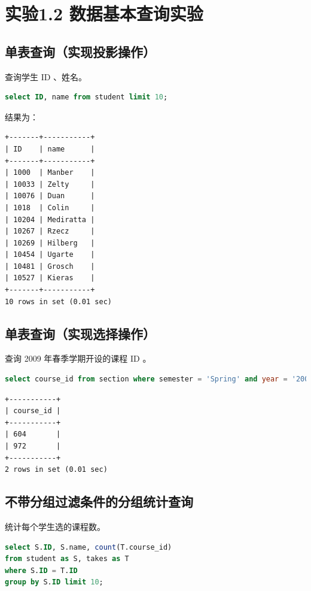 \documentclass{article}
\begin{document}
\section{实验1.2 数据基本查询实验}

\subsection{单表查询（实现投影操作）}

查询学生 ID 、姓名。

\begin{lstlisting}[language=sql]
select ID, name from student limit 10;
\end{lstlisting}

结果为：

\begin{lstlisting}
+-------+-----------+
| ID    | name      |
+-------+-----------+
| 1000  | Manber    |
| 10033 | Zelty     |
| 10076 | Duan      |
| 1018  | Colin     |
| 10204 | Mediratta |
| 10267 | Rzecz     |
| 10269 | Hilberg   |
| 10454 | Ugarte    |
| 10481 | Grosch    |
| 10527 | Kieras    |
+-------+-----------+
10 rows in set (0.01 sec)
\end{lstlisting}

\subsection{单表查询（实现选择操作）}

查询 2009 年春季学期开设的课程 ID 。

\begin{lstlisting}[language=sql]
select course_id from section where semester = 'Spring' and year = '2009';
\end{lstlisting}

\begin{lstlisting}
+-----------+
| course_id |
+-----------+
| 604       |
| 972       |
+-----------+
2 rows in set (0.01 sec)
\end{lstlisting}

\subsection{不带分组过滤条件的分组统计查询}

统计每个学生选的课程数。

\begin{lstlisting}[language=sql]
select S.ID, S.name, count(T.course_id) 
from student as S, takes as T 
where S.ID = T.ID 
group by S.ID limit 10;
\end{lstlisting}
\end{document}
